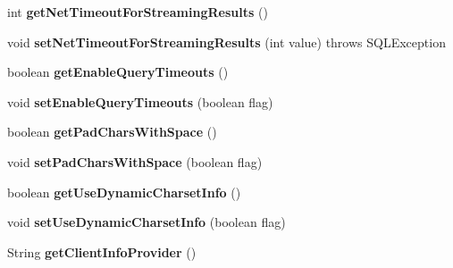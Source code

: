 \begin{DoxyCompactItemize}
int {\bfseries get\+Net\+Timeout\+For\+Streaming\+Results} ()
\item 
\mbox{\label{classcom_1_1mysql_1_1jdbc_1_1_connection_properties_impl_a0c5f3e43b72a6bc91fa1cde5073a0cdb}} 
void {\bfseries set\+Net\+Timeout\+For\+Streaming\+Results} (int value)  throws S\+Q\+L\+Exception 
\item 
\mbox{\label{classcom_1_1mysql_1_1jdbc_1_1_connection_properties_impl_ad1b98492c8cf8a9d0aa53b02ed743e7e}} 
boolean {\bfseries get\+Enable\+Query\+Timeouts} ()
\item 
\mbox{\label{classcom_1_1mysql_1_1jdbc_1_1_connection_properties_impl_a1a5a9143598ff445b1c8acdce766bcdb}} 
void {\bfseries set\+Enable\+Query\+Timeouts} (boolean flag)
\item 
\mbox{\label{classcom_1_1mysql_1_1jdbc_1_1_connection_properties_impl_a6b19e25229c45e7be9f3631a2797facb}} 
boolean {\bfseries get\+Pad\+Chars\+With\+Space} ()
\item 
\mbox{\label{classcom_1_1mysql_1_1jdbc_1_1_connection_properties_impl_afe639addee24b5444e8b3a52640d0274}} 
void {\bfseries set\+Pad\+Chars\+With\+Space} (boolean flag)
\item 
\mbox{\label{classcom_1_1mysql_1_1jdbc_1_1_connection_properties_impl_a274be30c1c1c4f5bcb3b62ae4cf030fd}} 
boolean {\bfseries get\+Use\+Dynamic\+Charset\+Info} ()
\item 
\mbox{\label{classcom_1_1mysql_1_1jdbc_1_1_connection_properties_impl_a9c985f738c89de866dd2156b51149189}} 
void {\bfseries set\+Use\+Dynamic\+Charset\+Info} (boolean flag)
\item 
\mbox{\label{classcom_1_1mysql_1_1jdbc_1_1_connection_properties_impl_a29ca85ffc1644812c480f6eb365f1663}} 
String {\bfseries get\+Client\+Info\+Provider} ()

\end{DoxyCompactItemize}
